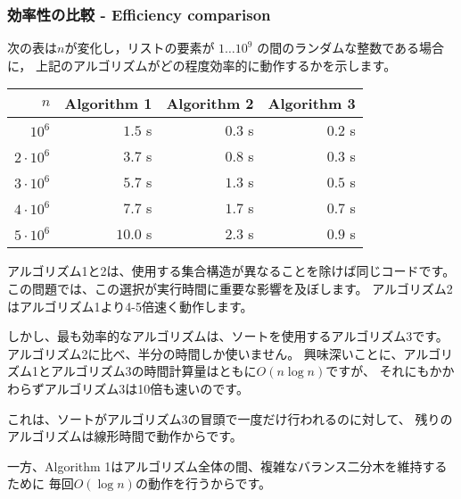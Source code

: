 \subsubsection{効率性の比較 - Efficiency comparison}

次の表は$n$が変化し，リストの要素が $1 \ldots 10^9$ の間のランダムな整数である場合に，
上記のアルゴリズムがどの程度効率的に動作するかを示します。

\begin{center}
\begin{tabular}{rrrr}
$n$ & Algorithm 1 & Algorithm 2 & Algorithm 3 \\
\hline
$10^6$ & $1.5$ s & $0.3$ s & $0.2$ s \\
$2 \cdot 10^6$ & $3.7$ s & $0.8$ s & $0.3$ s \\
$3 \cdot 10^6$ & $5.7$ s & $1.3$ s & $0.5$ s \\
$4 \cdot 10^6$ & $7.7$ s & $1.7$ s & $0.7$ s \\
$5 \cdot 10^6$ & $10.0$ s & $2.3$ s & $0.9$ s \\
\end{tabular}
\end{center}

アルゴリズム1と2は、使用する集合構造が異なることを除けば同じコードです。
この問題では、この選択が実行時間に重要な影響を及ぼします。
アルゴリズム2はアルゴリズム1より4-5倍速く動作します。

しかし、最も効率的なアルゴリズムは、ソートを使用するアルゴリズム3です。
アルゴリズム2に比べ、半分の時間しか使いません。
興味深いことに、アルゴリズム1とアルゴリズム3の時間計算量はともに$O(n \log n)$ですが、
それにもかかわらずアルゴリズム3は10倍も速いのです。

これは、ソートがアルゴリズム3の冒頭で一度だけ行われるのに対して、
残りのアルゴリズムは線形時間で動作からです。

一方、Algorithm 1はアルゴリズム全体の間、複雑なバランス二分木を維持するために
毎回$O(\log n)$の動作を行うからです。